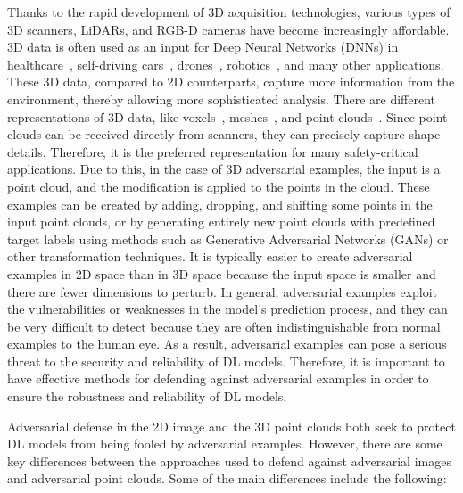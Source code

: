 \documentclass{ieeeaccess}
\begin{document}
Thanks to the rapid development of 3D acquisition technologies, various types of 3D scanners, LiDARs, and RGB-D cameras have become increasingly affordable. 3D data is often used as an input for Deep Neural Networks (DNNs) in %
healthcare~\cite{mozaffari2014systematic}, self-driving cars~\cite{badue2021self}, drones~\cite{hassanalian2017classifications}, robotics~\cite{pierson2017deep}, and many other applications. These 3D data, compared to 2D counterparts, %
capture more information from the environment, thereby allowing more sophisticated analysis. %
There are different representations of 3D data, like voxels~\cite{liu2019point}, meshes~\cite{ladicky2017point}, and point clouds~\cite{qi2017pointnet}. Since point clouds can be received directly from scanners, they can precisely capture shape details.
Therefore, it is the preferred representation for many safety-critical applications. Due to this, in the case of 3D adversarial examples, the input is a point cloud, and the modification is applied to the points in the cloud. These examples can be created by adding, dropping, and shifting some points in the input point clouds, or by generating entirely new point clouds with predefined target labels using methods such as Generative Adversarial Networks (GANs) or other transformation techniques.
It is typically easier to create adversarial examples in 2D space than in 3D space because the input space is smaller and there are fewer dimensions to perturb. 
In general, adversarial examples exploit the vulnerabilities or weaknesses in the model's prediction process, and they can be very difficult to detect because they are often indistinguishable from normal examples to the human eye. As a result, adversarial examples can pose a serious threat to the security and reliability of DL %
models. Therefore, it is important to have effective methods for defending against adversarial examples in order to ensure the robustness and reliability of DL %
models.

Adversarial defense in the 2D image and the 3D point clouds both seek to protect DL %
models from being fooled by adversarial examples. However, there are some key differences between the approaches used to defend against adversarial images and adversarial point clouds. Some of the main differences include the following:
\end{document}
